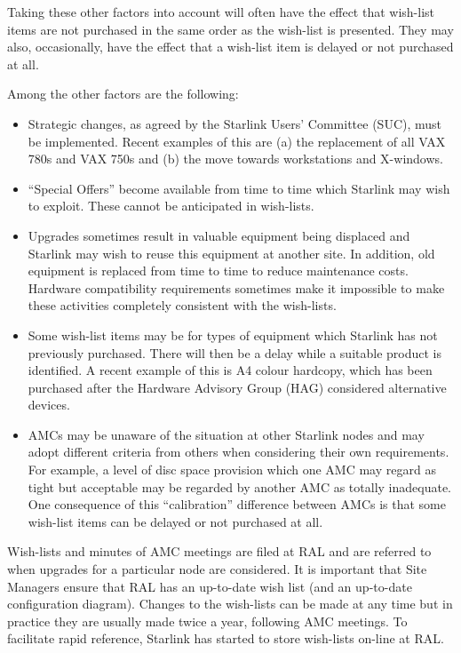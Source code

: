 Taking these other factors into account will often have the effect that
wish-list items are not purchased in the same order as the wish-list
is presented.  They may also, occasionally, have the effect that a
wish-list item is delayed or not purchased at all.
 
Among the other factors are the following:
\begin{itemize}
\item
Strategic changes, as agreed by the Starlink Users' Committee (SUC), must be
implemented.  Recent examples of this are (a) the replacement of all
VAX 780s and VAX 750s and (b) the move towards workstations and X-windows.
\item
``Special Offers'' become available from time to time which Starlink
may wish to exploit.  These cannot be anticipated in wish-lists.
\item
Upgrades sometimes result in valuable equipment being displaced and
Starlink may wish to reuse this equipment at another site.
In addition, old equipment is replaced from time to time
to reduce maintenance costs.  Hardware compatibility requirements
sometimes make it impossible to make these activities completely
consistent with the wish-lists.
\item
Some wish-list items may be for types of equipment which Starlink has
not previously purchased.  There will then be a delay while a
suitable product is identified.  A recent example of this is
A4 colour hardcopy, which has been purchased after the Hardware
Advisory Group (HAG) considered alternative devices.
\item
AMCs may be unaware of the situation at other Starlink nodes and may
adopt different criteria from others when considering their own requirements.
For example, a level of disc space provision which one AMC may regard as
tight but acceptable may be regarded by another AMC as totally
inadequate.  One consequence of this ``calibration'' difference between AMCs
is that some wish-list items can be delayed or not purchased at all.
\end{itemize}
Wish-lists and minutes of AMC meetings are filed at RAL and are
referred to when upgrades for a particular node are considered.
It is important that Site Managers ensure that RAL has an up-to-date
wish list (and an up-to-date configuration diagram).  Changes
to the wish-lists can be made at any time but in practice they are usually
made twice a year, following AMC meetings.  To facilitate rapid reference,
Starlink has started to store wish-lists on-line at RAL.
 
